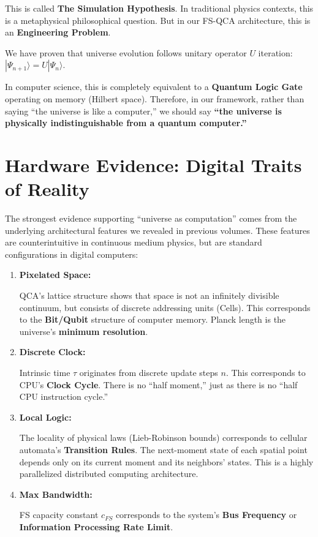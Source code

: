 \documentclass[11pt,a4paper,twoside]{book}
\begin{document}
This is called \textbf{The Simulation Hypothesis}. In traditional physics contexts, this is a metaphysical philosophical question. But in our FS-QCA architecture, this is an \textbf{Engineering Problem}.

We have proven that universe evolution follows unitary operator $U$ iteration: $|\Psi_{n+1}\rangle = U |\Psi_n\rangle$.

In computer science, this is completely equivalent to a \textbf{Quantum Logic Gate} operating on memory (Hilbert space). Therefore, in our framework, rather than saying ``the universe is like a computer,'' we should say \textbf{``the universe is physically indistinguishable from a quantum computer.''}

\section{Hardware Evidence: Digital Traits of Reality}

The strongest evidence supporting ``universe as computation'' comes from the underlying architectural features we revealed in previous volumes. These features are counterintuitive in continuous medium physics, but are standard configurations in digital computers:

\begin{enumerate}
\item \textbf{Pixelated Space:}

   QCA's lattice structure shows that space is not an infinitely divisible continuum, but consists of discrete addressing units (Cells). This corresponds to the \textbf{Bit/Qubit} structure of computer memory. Planck length is the universe's \textbf{minimum resolution}.

\item \textbf{Discrete Clock:}

   Intrinsic time $\tau$ originates from discrete update steps $n$. This corresponds to CPU's \textbf{Clock Cycle}. There is no ``half moment,'' just as there is no ``half CPU instruction cycle.''

\item \textbf{Local Logic:}

   The locality of physical laws (Lieb-Robinson bounds) corresponds to cellular automata's \textbf{Transition Rules}. The next-moment state of each spatial point depends only on its current moment and its neighbors' states. This is a highly parallelized distributed computing architecture.

\item \textbf{Max Bandwidth:}

   FS capacity constant $c_{FS}$ corresponds to the system's \textbf{Bus Frequency} or \textbf{Information Processing Rate Limit}.
\end{enumerate}
\end{document}
